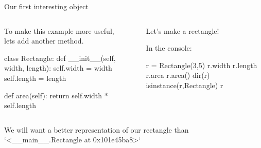 \documentclass[aspectratio=149, handout] {beamer}
\begin{document}
\begin{frame}[fragile,t]{Our first interesting object}


  \begin{columns}
    \begin{column}[t]{.59\textwidth}
      To make this example more useful,\\lets add another method. 
 
      \pause
      \begin{smallpythoncode}
        class Rectangle:
            def __init__(self, width, length):
                self.width = width
                self.length = length
    
            def area(self):
                return self.width * self.length
      \end{smallpythoncode}
    \end{column}
    \begin{column}[t]{.42\textwidth}
      Let's make a rectangle!  

      In the console:
      \begin{pythoncode}
        r = Rectangle(3,5)
        r.width
        r.length
        r.area
        r.area()
        dir(r)
        isinstance(r,Rectangle)
        r
      \end{pythoncode}
    \end{column}
  \end{columns}

  \bigskip \pause
  
  We will want a better representation of our rectangle than \inline`<__main__.Rectangle at 0x101e45ba8>`

\end{frame}
\end{document}
